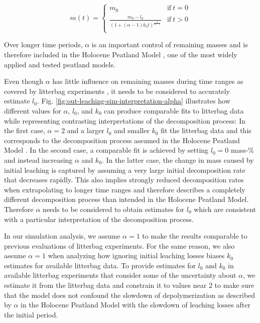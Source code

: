 \documentclass[bg, manuscript]{copernicus}
\begin{document}
\begin{equation}
m(t) = \begin{cases}
m_0 & \mathrm{if}~t=0\\
\frac{m_0 - l_0}{(1 + (\alpha - 1) k_0 t)^{\frac{1}{\alpha - 1}}} & \mathrm{if}~t>0\\
\end{cases}
\label{eq:decomposition-solution-2-with-leaching-1}
\end{equation}

Over longer time periods, \(\alpha\) is an important control of remaining masses \citep{Frolking.2001} and is therefore included in the Holocene Peatland Model \citep{Frolking.2010}, one of the most widely applied and tested peatland models.

Even though \(\alpha\) has little influence on remaining masses during time ranges as covered by litterbag experiments \citep{Frolking.2001, Frolking.2010}, it needs to be considered to accurately estimate \(l_0\). Fig. \ref{fig:out-leaching-sim-interpretation-alpha} illustrates how different values for \(\alpha\), \(l_0\), and \(k_0\) can produce comparable fits to litterbag data while representing contrasting interpretations of the decomposition process: In the first case, \(\alpha=2\) and a larger \(l_0\) and smaller \(k_0\) fit the litterbag data and this corresponds to the decomposition process assumed in the Holocene Peatland Model \citep{Frolking.2010}. In the second case, a comparable fit is achieved by setting \(l_0=0\) mass-\% and instead increasing \(\alpha\) and \(k_0\). In the latter case, the change in mass caused by initial leaching is captured by assuming a very large initial decomposition rate that decreases rapidly. This also implies strongly reduced decomposition rates when extrapolating to longer time ranges and therefore describes a completely different decomposition process than intended in the Holocene Peatland Model. Therefore \(\alpha\) needs to be considered to obtain estimates for \(l_0\) which are consistent with a particular interpretation of the decomposition process.

In our simulation analysis, we assume \(\alpha = 1\) to make the results comparable to previous evaluations of litterbag experiments. For the same reason, we also assume \(\alpha = 1\) when analyzing how ignoring initial leaching losses biases \(k_0\) estimates for available litterbag data. To provide estimates for \(l_0\) and \(k_0\) in available litterbag experiments that consider some of the uncertainty about \(\alpha\), we estimate it from the litterbag data and constrain it to values near 2 to make sure that the model does not confound the slowdown of depolymerization as described by \(\alpha\) in the Holocene Peatland Model with the slowdown of leaching losses after the initial period.
\end{document}
